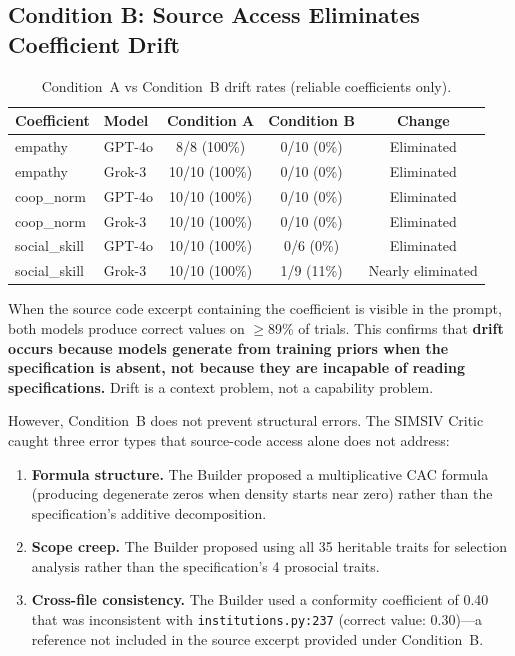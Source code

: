 \documentclass[11pt,a4paper]{article}
\begin{document}
\subsection{Condition B: Source Access Eliminates Coefficient Drift}

\begin{table}[ht]
\centering
\caption{Condition~A vs Condition~B drift rates (reliable coefficients only).}
\label{tab:conditionb}
\begin{tabular}{@{}llccc@{}}
\toprule
Coefficient & Model & Condition A & Condition B & Change \\
\midrule
empathy & GPT-4o & 8/8 (100\%) & 0/10 (0\%) & Eliminated \\
empathy & Grok-3 & 10/10 (100\%) & 0/10 (0\%) & Eliminated \\
coop\_norm & GPT-4o & 10/10 (100\%) & 0/10 (0\%) & Eliminated \\
coop\_norm & Grok-3 & 10/10 (100\%) & 0/10 (0\%) & Eliminated \\
social\_skill & GPT-4o & 10/10 (100\%) & 0/6 (0\%) & Eliminated \\
social\_skill & Grok-3 & 10/10 (100\%) & 1/9 (11\%) & Nearly eliminated \\
\bottomrule
\end{tabular}
\end{table}

When the source code excerpt containing the coefficient is visible in the prompt, both models produce correct values on $\geq$89\% of trials. This confirms that \textbf{drift occurs because models generate from training priors when the specification is absent, not because they are incapable of reading specifications.} Drift is a context problem, not a capability problem.

However, Condition~B does not prevent structural errors. The SIMSIV Critic caught three error types that source-code access alone does not address:
\begin{enumerate}[leftmargin=*]
\item \textbf{Formula structure.} The Builder proposed a multiplicative CAC formula (producing degenerate zeros when density starts near zero) rather than the specification's additive decomposition.
\item \textbf{Scope creep.} The Builder proposed using all 35 heritable traits for selection analysis rather than the specification's 4 prosocial traits.
\item \textbf{Cross-file consistency.} The Builder used a conformity coefficient of 0.40 that was inconsistent with \texttt{institutions.py:237} (correct value: 0.30)---a reference not included in the source excerpt provided under Condition~B.
\end{enumerate}
\end{document}
